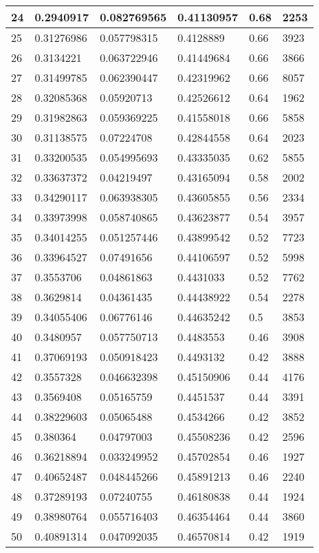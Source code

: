 \begin{longtable}{|l|l|l|l|l|l|}
24 & 0.2940917 & 0.082769565 & 0.41130957 & 0.68 & 2253 \\ \hline 
25 & 0.31276986 & 0.057798315 & 0.4128889 & 0.66 & 3923 \\ \hline 
26 & 0.3134221 & 0.063722946 & 0.41449684 & 0.66 & 3866 \\ \hline 
27 & 0.31499785 & 0.062390447 & 0.42319962 & 0.66 & 8057 \\ \hline 
28 & 0.32085368 & 0.05920713 & 0.42526612 & 0.64 & 1962 \\ \hline 
29 & 0.31982863 & 0.059369225 & 0.41558018 & 0.66 & 5858 \\ \hline 
30 & 0.31138575 & 0.07224708 & 0.42844558 & 0.64 & 2023 \\ \hline 
31 & 0.33200535 & 0.054995693 & 0.43335035 & 0.62 & 5855 \\ \hline 
32 & 0.33637372 & 0.04219497 & 0.43165094 & 0.58 & 2002 \\ \hline 
33 & 0.34290117 & 0.063938305 & 0.43605855 & 0.56 & 2334 \\ \hline 
34 & 0.33973998 & 0.058740865 & 0.43623877 & 0.54 & 3957 \\ \hline 
35 & 0.34014255 & 0.051257446 & 0.43899542 & 0.52 & 7723 \\ \hline 
36 & 0.33964527 & 0.07491656 & 0.44106597 & 0.52 & 5998 \\ \hline 
37 & 0.3553706 & 0.04861863 & 0.4431033 & 0.52 & 7762 \\ \hline 
38 & 0.3629814 & 0.04361435 & 0.44438922 & 0.54 & 2278 \\ \hline 
39 & 0.34055406 & 0.06776146 & 0.44635242 & 0.5 & 3853 \\ \hline 
40 & 0.3480957 & 0.057750713 & 0.4483553 & 0.46 & 3908 \\ \hline 
41 & 0.37069193 & 0.050918423 & 0.4493132 & 0.42 & 3888 \\ \hline 
42 & 0.3557328 & 0.046632398 & 0.45150906 & 0.44 & 4176 \\ \hline 
43 & 0.3569408 & 0.05165759 & 0.4451537 & 0.44 & 3391 \\ \hline 
44 & 0.38229603 & 0.05065488 & 0.4534266 & 0.42 & 3852 \\ \hline 
45 & 0.380364 & 0.04797003 & 0.45508236 & 0.42 & 2596 \\ \hline 
46 & 0.36218894 & 0.033249952 & 0.45702854 & 0.46 & 1927 \\ \hline 
47 & 0.40652487 & 0.048445266 & 0.45891213 & 0.46 & 2240 \\ \hline 
48 & 0.37289193 & 0.07240755 & 0.46180838 & 0.44 & 1924 \\ \hline 
49 & 0.38980764 & 0.055716403 & 0.46354464 & 0.44 & 3860 \\ \hline 
50 & 0.40891314 & 0.047092035 & 0.46570814 & 0.42 & 1919 \\ \hline 
\end{longtable}